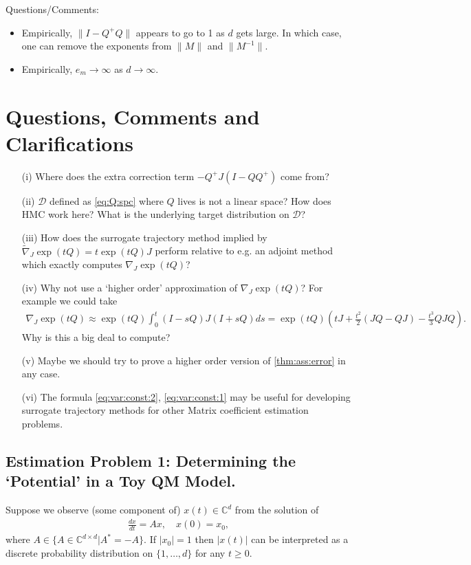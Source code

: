 \documentclass[twoside]{article}
\numberwithin{equation}{section}
\newcommand{\CC}{\mathbb{C}}
\begin{document}
Questions/Comments:
\begin{itemize}
	\item Empirically, $\lVert I-Q^+Q\rVert$ appears to go to 1 as $d$ gets large.   In which case, one can remove the exponents from $\lVert M \rVert$ and $\lVert M^{-1} \rVert$.
	\item Empirically, $e_m \rightarrow \infty$ as $d \rightarrow \infty$.
\end{itemize}

\section{Questions, Comments and Clarifications}

\begin{itemize}
\item[(i)] Where does the extra correction term $-Q^+ J (I- Q Q^+)$ come from?
\item[(ii)] $\mathcal{D}$ defined as \eqref{eq:Q:spc} where $Q$ lives is not a linear space?  How does HMC work here?  What is the underlying target distribution on $\mathcal{D}$?
\item[(iii)] How does the surrogate trajectory method implied by $\tilde{\nabla}_J \exp(t Q) = t  \exp(t Q) J$ perform relative to 
e.g. an adjoint method which exactly computes $\nabla_J \exp(t Q)$?
\item[(iv)] Why not use a `higher order' approximation of $\nabla_J \exp(t Q)$?  For example we could take
\begin{align}
	\nabla_J \exp(t Q) \approx \exp(t Q) \int_0^t (I - sQ) J (I + sQ)ds = \exp(tQ) \left(tJ + \frac{t^2}{2} (JQ - QJ) -\frac{t^3}{3} QJ Q\right).
\end{align}
Why is this a big deal to compute?
\item[(v)] Maybe we should try to prove a higher order version of \eqref{thm:ass:error} in any case.
\item[(vi)] The formula \eqref{eq:var:const:2}, \eqref{eq:var:const:1} may be useful for developing surrogate trajectory methods for other Matrix coefficient estimation problems.


\end{itemize}

\subsection{Estimation Problem 1: Determining the `Potential' in a Toy QM Model.}

Suppose we observe (some component of) $x(t) \in \CC^d$ from the solution of
\begin{align}
	\frac{d x}{dt} = A x, \quad x(0) = x_0,
\end{align}
where $A \in \{ A \in \CC^{d\times d} | A^* = -A\}$.  If $|x_0| =1$ then $|x(t)|$  can be interpreted as a discrete probability distribution on $\{1, \ldots, d\}$ for any $t \geq 0$.
\end{document}
